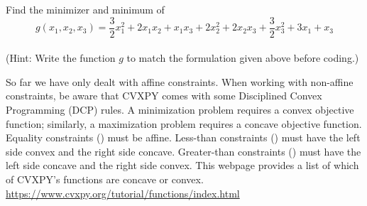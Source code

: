 \begin{problem}
Find the minimizer and minimum of
\begin{equation*}
g(x_1,x_2,x_3) = \frac{3}{2}x_1^2 +2x_1x_2 + x_1x_3+ 2x_2^2 +2x_2x_3+\frac{3}{2}x_3^2+3x_1 + x_3
\end{equation*}
\\(Hint: Write the function $g$ to match the formulation given above before coding.)
\begin{comment}
\begin{equation}
f(x) = \frac{1}{2}x\trp Qx - x\trp p
\end{equation}
where

\begin{center}
$Q =
\begin{bmatrix}
3 & 2 & 1\\
2 & 4 & 2\\
1 & 2 & 3\\
\end{bmatrix}
$
and $p =
\begin{bmatrix}
3\\
0\\
1\\
\end{bmatrix}
$
\end{center}
\end{comment}

\end{problem}

So far we have only dealt with affine constraints.
When working with non-affine constraints, be aware that CVXPY comes with some Disciplined Convex Programming (DCP) rules.
A minimization problem requires a convex objective function; similarly, a maximization problem requires a concave objective function.
Equality constraints (\li{==}) must be affine.
Less-than constraints (\li{<=}) must have the left side convex and the right side concave.
Greater-than constraints (\li{>=}) must have the left side concave and the right side convex.
This webpage provides a list of which of CVXPY's functions are concave or convex.
\url{https://www.cvxpy.org/tutorial/functions/index.html}

